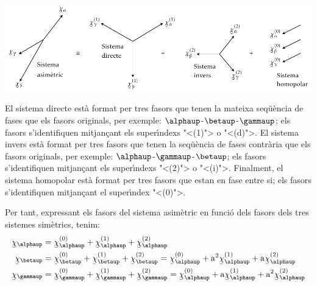 \begin{center}
    \includegraphics{Imatges/Cap-CompSim-CompSim.pdf}
    \label{pic:Comp_sim}
\end{center}

 
 El sistema directe est\`{a} format per tres
fasors que tenen la mateixa seq\"{u}\`{e}ncia de fases que els fasors
originals, per exemple: $\alphaup$-$\betaup$-$\gammaup$; els fasors
s'identifiquen mitjan\c{c}ant els super\'{\i}ndexs {"<}(1){">} o {"<}(d){">}. El sistema
invers est\`{a} format per tres fasors que tenen la seq\"{u}\`{e}ncia de fases contr\`{a}ria
 que els fasors originals, per exemple:
$\alphaup$-$\gammaup$-$\betaup$; els fasors s'identifiquen mitjan\c{c}ant els
super\'{\i}ndexs {"<}(2){">} o {"<}(i){">}. Finalment, el sistema homopolar est\`{a}
format per tres fasors que estan en fase entre si; els fasors
s'identifiquen mitjan\c{c}ant el super\'{\i}ndex {"<}(0){">}.

Per tant, expressant els fasors del sistema asim\`{e}tric en funci\'{o}
dels fasors dels tres sistemes sim\`{e}trics, tenim:
\begin{subequations}
\begin{align}
   \cmplx{\chi}_\alphaup &= \cmplx{\chi}_\alphaup\ap{(0)}  +
   \cmplx{\chi}_\alphaup\ap{(1)} + \cmplx{\chi}_\alphaup\ap{(2)} \label{eq:c_sim_a}\\
   \cmplx{\chi}_\betaup &= \cmplx{\chi}_\betaup\ap{(0)} + \cmplx{\chi}_\betaup\ap{(1)} +
   \cmplx{\chi}_\betaup\ap{(2)}  =  \cmplx{\chi}_\alphaup\ap{(0)} + \au^2
   \cmplx{\chi}_\alphaup\ap{(1)} + \au \cmplx{\chi}_\alphaup\ap{(2)} \label{eq:c_sim_b}\\
   \cmplx{\chi}_\gammaup &= \cmplx{\chi}_\gammaup\ap{(0)} + \cmplx{\chi}_\gammaup\ap{(1)} +
   \cmplx{\chi}_\gammaup\ap{(2)}  = \cmplx{\chi}_\alphaup\ap{(0)} + \au
   \cmplx{\chi}_\alphaup\ap{(1)} + \au^2 \cmplx{\chi}_\alphaup\ap{(2)} \label{eq:c_sim_c}
\end{align}
\end{subequations}

